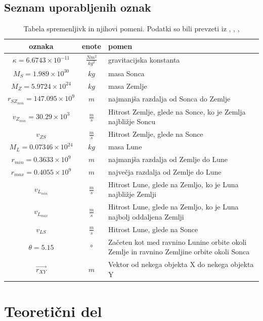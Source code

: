 \documentclass[titlepage,12pt,a4paper]{article}
\begin{document}
\subsection{Seznam uporabljenih oznak}
\begin{table}[H]
\begin{large}
\renewcommand{\arraystretch}{1.3}
\begin{tabular}{ |c| c || p{8.5cm} | }
 oznaka& enote& pomen\\
 \hline
 \hline
 $\kappa = 6.6743 \times 10^{-11}$& $\frac{Nm^{2}}{kg^{2}}$ & gravitacijska konstanta\\
 $M_S = 1.989 \times 10^{30}$ & $kg$ & masa Sonca \\
 $M_Z = 5.9724 \times 10^{24}$ & $kg$ & masa Zemlje  \\
 $r_{SZ_{min}} = 147.095 \times 10^{9}$ & $m$ & najmanjša razdalja od Sonca do Zemlje \\
 $v_{Z_{min}} = 30.29 \times 10^{3}$ & $\frac{m}{s}$ & Hitrost Zemlje, glede na Sonce, ko je  Zemlja najbližje Soncu \\
 $v_{ZS}$ & $\frac{m}{s}$ & Hitrost Zemlje, glede na Sonce \\
 $M_L = 0.07346 \times 10^{24}$ & $kg$ & masa Lune \\
 $r_{{min}} = 0.3633 \times 10^{9}$ & $m$ & najmanjša razdalja od Zemlje do Lune \\
 $r_{{max}} = 0.4055 \times 10^{9}$ & $m$ & največja razdalja od Zemlje do Lune \\
 $v_{L_{min}}$ & $\frac{m}{s}$ & Hitrost Lune, glede na Zemljo, ko je Luna najbližje Zemlji \\
 $v_{L_{max}}$ & $\frac{m}{s}$ & Hitrost Lune, glede na Zemljo, ko je Luna najbolj oddaljena Zemlji\\
 $v_{LS}$ & $\frac{m}{s}$ & Hitrost Lune, glede na Sonce \\
 $\theta = 5.15$ & ° & Začeten kot med ravnino Lunine orbite okoli Zemlje in ravnino Zemljine orbite okoli Sonca\\
 $\overrightarrow{r_{XY}}$ & $m$ & Vektor od nekega objekta X do nekega objekta Y \\
 \hline
\end{tabular}
\caption{Tabela spremenljivk in njihovi pomeni. Podatki so bili prevzeti iz \cite{Zak nal}, \cite{Luna}, \cite{Zemlja}, \cite{Sonce}}
\end{large}
\end{table}

\section{Teoretični del}
\label{sec : teoreticni del}
\end{document}
